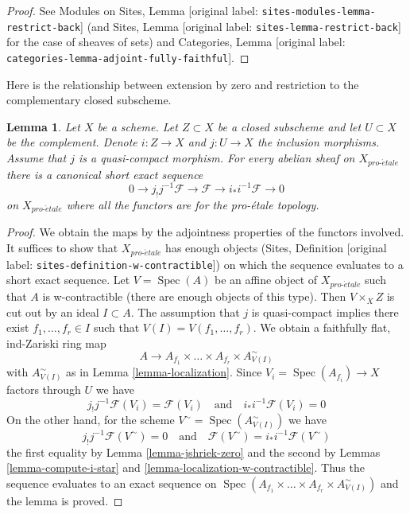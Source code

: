 \documentclass[10pt,a4paper]{article}
\theoremstyle{plain}
\newtheorem{lemma}[subsection]{Lemma}
\theoremstyle{definition}
\theoremstyle{remark}
\numberwithin{equation}{subsection}
\def\Spec{\mathop{\mathrm{Spec}}}
\def\proetale{{pro\text{-}\acute{e}tale}}
\begin{document}
\begin{proof}
See Modules on Sites, Lemma \textnormal{[original label: \nolinkurl{sites-modules-lemma-restrict-back}]}
(and Sites, Lemma \textnormal{[original label: \nolinkurl{sites-lemma-restrict-back}]} for the case
of sheaves of sets) and
Categories, Lemma \textnormal{[original label: \nolinkurl{categories-lemma-adjoint-fully-faithful}]}.
\end{proof}

\noindent
Here is the relationship between extension by zero and restriction
to the complementary closed subscheme.

\begin{lemma}
\label{lemma-ses-associated-to-open}
Let $X$ be a scheme. Let $Z \subset X$ be a closed subscheme and let
$U \subset X$ be the complement. Denote $i : Z \to X$ and $j : U \to X$
the inclusion morphisms. Assume that $j$ is a quasi-compact morphism.
For every abelian sheaf on $X_\proetale$ there is a canonical short exact
sequence
$$
0 \to j_!j^{-1}\mathcal{F} \to \mathcal{F} \to i_*i^{-1}\mathcal{F} \to 0
$$
on $X_\proetale$ where all the functors are for the pro-\'etale topology.
\end{lemma}

\begin{proof}
We obtain the maps by the adjointness properties of the functors involved.
It suffices to show that $X_\proetale$ has enough objects
(Sites, Definition \textnormal{[original label: \nolinkurl{sites-definition-w-contractible}]}) on which
the sequence evaluates to a short exact sequence.
Let $V = \Spec(A)$ be an affine object of $X_\proetale$
such that $A$ is w-contractible (there are enough objects of this type).
Then $V \times_X Z$ is cut out by an ideal $I \subset A$.
The assumption that $j$ is quasi-compact implies there exist
$f_1, \ldots, f_r \in I$ such that $V(I) = V(f_1, \ldots, f_r)$.
We obtain a faithfully flat, ind-Zariski ring map
$$
A \longrightarrow A_{f_1} \times \ldots \times A_{f_r} \times
A_{V(I)}^\sim
$$
with $A_{V(I)}^\sim$ as in Lemma \ref{lemma-localization}.
Since $V_i = \Spec(A_{f_i}) \to X$ factors through $U$ we have
$$
j_!j^{-1}\mathcal{F}(V_i) = \mathcal{F}(V_i)
\quad\text{and}\quad
i_*i^{-1}\mathcal{F}(V_i) = 0
$$
On the other hand, for the scheme $V^\sim = \Spec(A_{V(I)}^\sim)$
we have
$$
j_!j^{-1}\mathcal{F}(V^\sim) = 0
\quad\text{and}\quad
\mathcal{F}(V^\sim) = i_*i^{-1}\mathcal{F}(V^\sim)
$$
the first equality by Lemma \ref{lemma-jshriek-zero}
and the second by
Lemmas \ref{lemma-compute-i-star} and \ref{lemma-localization-w-contractible}.
Thus the sequence evaluates to an exact sequence on
$\Spec(A_{f_1} \times \ldots \times A_{f_r} \times A_{V(I)}^\sim)$
and the lemma is proved.
\end{proof}
\end{document}
